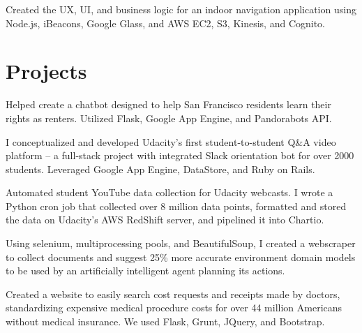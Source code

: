 \documentclass[]{deedy-resume-openfont}
\begin{document}
\begin{minipage}[t]{0.66\textwidth}
\begin{tightemize}
\item Created the UX, UI, and business logic for an indoor navigation application using Node.js, iBeacons, Google Glass, and AWS EC2, S3, Kinesis, and Cognito.
\end{tightemize}


\section{Projects}

\begin{tightemize}
\item Helped create a chatbot designed to help San Francisco residents learn their rights as renters. Utilized Flask, Google App Engine, and Pandorabots API.
\end{tightemize}
\sectionsep

\begin{tightemize}
\item I conceptualized and developed Udacity's first student-to-student Q\&A video platform -- a full-stack project with integrated Slack orientation bot for over 2000 students. Leveraged Google App Engine, DataStore, and Ruby on Rails.
\end{tightemize}
\sectionsep

\begin{tightemize}
\item Automated student YouTube data collection for Udacity webcasts. I wrote a Python cron job that collected over 8 million data points, formatted and stored the data on Udacity's AWS RedShift server, and pipelined it into Chartio.
\end{tightemize}
\sectionsep

\begin{tightemize}
\item Using selenium, multiprocessing pools, and BeautifulSoup, I created a webscraper to collect documents and suggest 25\% more accurate environment domain models to be used by an artificially intelligent agent planning its actions. 
\end{tightemize}
\sectionsep

\begin{tightemize}
\item Created a website to easily search cost requests and receipts made by doctors, standardizing expensive medical procedure costs for over 44 million Americans without medical insurance. We used Flask, Grunt, JQuery, and Bootstrap.
\end{tightemize}
\sectionsep


\end{minipage}
\end{document}
